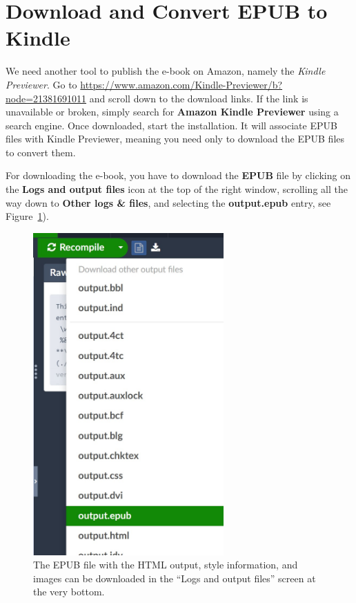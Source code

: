 \section{Download and Convert EPUB to Kindle}
\label{converthtmltokindle:sec}

We need another tool to publish the e-book on Amazon, namely the \textit{Kindle Previewer}. Go to \url{https://www.amazon.com/Kindle-Previewer/b?node=21381691011} and scroll down to the download links. If the link is unavailable or broken, simply search for \textbf{Amazon Kindle Previewer} using a search engine. Once downloaded, start the installation. It will associate EPUB files with Kindle Previewer, meaning you need only to download the EPUB files to convert them.



For downloading the e-book, you have to download the \textbf{EPUB} file by clicking on the \textbf{Logs and output files} icon at the top of the right window, scrolling all the way down to \textbf{Other logs \& files}, and selecting the \textbf{output.epub} entry, see Figure~\ref{downloadepub:fig}).

\begin{figure}[H]\centering
\includegraphics[width=0.65\textwidth]{images/downloadEPUB.jpg}
\caption{The EPUB file with the HTML output, style information, and images can be downloaded in the ``Logs and output files'' screen at the very bottom.}
\label{downloadepub:fig}
\end{figure}

